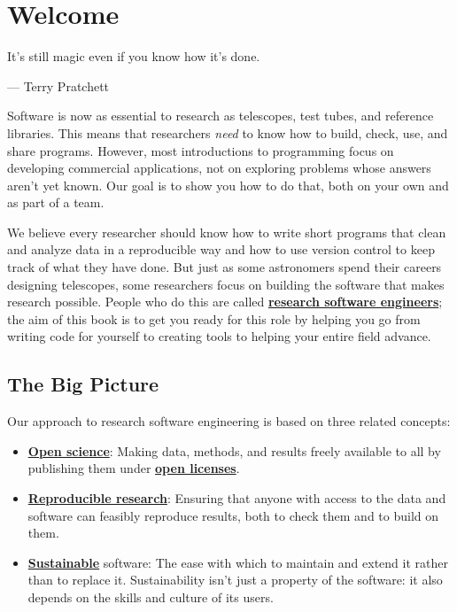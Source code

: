 \documentclass[
]{krantz}
\renewenvironment{quote}{\begin{VF}}{\end{VF}}
\newcommand{\gref}[2]{\hyperlink{#2}{\textbf{#1}}}
\begin{document}
{
\setcounter{tocdepth}{1}
\tableofcontents
}
\listoffigures
\mainmatter

\hypertarget{welcome}{%
\chapter*{Welcome}\label{welcome}}


\begin{quote}
It's still magic even if you know how it's done.

--- Terry Pratchett
\end{quote}

Software is now as essential to research as telescopes, test tubes, and reference libraries.
This means that researchers \emph{need} to know how to build, check, use, and share programs.
However,
most introductions to programming focus on developing commercial applications,
not on exploring problems whose answers aren't yet known.
Our goal is to show you how to do that,
both on your own and as part of a team.

We believe every researcher should know
how to write short programs that clean and analyze data in a reproducible way
and how to use version control to keep track of what they have done.
But just as some astronomers spend their careers designing telescopes,
some researchers focus on building the software that makes research possible.
People who do this are called \gref{research software engineers}{rse};
the aim of this book is to get you ready for this role by helping you go from
writing code for yourself to creating tools to helping your entire field advance.

\hypertarget{intro-big-picture}{%
\section{The Big Picture}\label{intro-big-picture}}

Our approach to research software engineering is based on three related concepts:

\begin{itemize}
\item
  \gref{Open science}{open\_science}: Making data, methods, and results
  freely available to all by publishing them under \gref{open
  licenses}{open\_license}.
\item
  \gref{Reproducible research}{reproducible\_research}: Ensuring that anyone
  with access to the data and software can feasibly reproduce results, both to
  check them and to build on them.
\item
  \gref{Sustainable}{sustainable\_software} software: The ease with which to
  maintain and extend it rather than to replace it. Sustainability isn't
  just a property of the software: it also depends on the skills and culture
  of its users.
\end{itemize}
\end{document}
